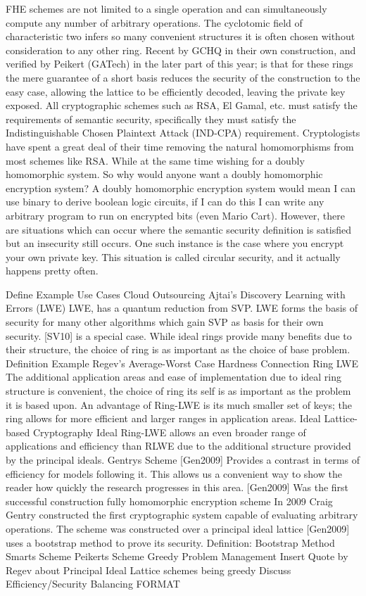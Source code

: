 FHE schemes are not limited to a single operation and can
simultaneously compute any number of arbitrary operations. The
cyclotomic field of characteristic two infers so many convenient
structures it is often chosen without consideration to any other ring.
Recent by GCHQ in their own construction, and verified by Peikert
(GATech) in the later part of this year; is that for these rings the
mere guarantee of a short basis reduces the security of the
construction to the easy case, allowing the lattice to be efficiently
decoded, leaving the private key exposed. All cryptographic schemes
such as RSA, El Gamal, etc. must satisfy the requirements of semantic
security, specifically they must satisfy the Indistinguishable Chosen
Plaintext Attack (IND-CPA) requirement. Cryptologists have spent a
great deal of their time removing the natural homomorphisms from most
schemes like RSA. While at the same time wishing for a doubly
homomorphic system. So why would anyone want a doubly homomorphic
encryption system? A doubly homomorphic encryption system would mean I
can use binary to derive boolean logic circuits, if I can do this I can
write any arbitrary program to run on encrypted bits (even Mario Cart).
However, there are situations which can occur where the semantic
security definition is satisfied but an insecurity still occurs. One
such instance is the case where you encrypt your own private key. This
situation is called circular security, and it actually happens pretty
often.

Define 
Example 
Use Cases 
Cloud Outsourcing 
Ajtai's Discovery 
Learning with Errors (LWE) 
LWE, has a quantum reduction from SVP. LWE forms the basis of security for many other algorithms which gain SVP as basis for their own security. [SV10] is a special case. While ideal rings provide many benefits due to their structure, the choice of ring is as
important as the choice of base problem. 
Definition 
Example 
Regev's Average-Worst Case Hardness Connection 
Ring LWE 
The additional application areas and ease of implementation due to ideal ring structure is convenient, the choice of ring its self is as important as the problem it is based upon. An
advantage of Ring-LWE is its much smaller set of keys; the ring allows for more efficient and larger ranges in application areas. 
Ideal Lattice-based Cryptography 
Ideal Ring-LWE allows an even broader range of applications and efficiency than RLWE due to the additional structure provided by the principal ideals. 
Gentrys Scheme [Gen2009] 
Provides a contrast in terms of efficiency for models following it. This allows us a convenient way to show the reader how quickly the research progresses in this area. 
[Gen2009] Was the first successful construction fully homomorphic encryption scheme In 2009 Craig Gentry constructed the first cryptographic system capable of evaluating arbitrary operations. The scheme was constructed over a principal ideal lattice [Gen2009] uses a bootstrap method to prove its security.
Definition: Bootstrap Method 
Smarts Scheme 
Peikerts Scheme 
Greedy Problem Management 
Insert Quote by Regev about Principal Ideal Lattice schemes being greedy 
Discuss Efficiency/Security Balancing
FORMAT
